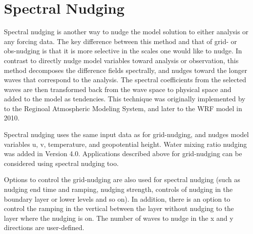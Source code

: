 \section{Spectral Nudging}

Spectral nudging is another way to nudge the model solution to either analysis or any forcing data. The key difference between this method and that of grid- or obs-nudging is that it is more selective in the scales one would like to nudge. In contrast to directly nudge model variables toward analysis or observation, this method decomposes the difference fields spectrally, and nudges toward the longer waves that correspond to the analysis. The spectral coefficients from the selected waves are then transformed back from the wave space to physical space and added to the model as tendencies. This technique was originally implemented by \citet{miguez04} to the Reginoal Atmospheric Modeling System, and later to the WRF model in 2010.

Spectral nudging uses the same input data as for grid-nudging, and nudges model variables u, v, temperature, and geopotential height. Water mixing ratio nudging was added in Version 4.0. Applications described above for grid-nudging can be considered using spectral nudging too.

Options to control the grid-nudging are also used for spectral nudging (such as nudging end time and ramping, nudging strength, controls of nudging in the boundary layer or lower levels and so on). In addition, there is an option to control the ramping in the vertical between the layer without nudging to the layer where the nudging is on. The number of waves to nudge in the x and y directions are user-defined.

